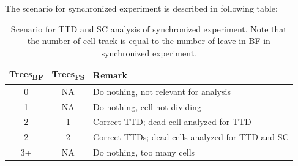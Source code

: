 \documentclass[pdftex,12pt,a4paper]{report}
\begin{document}
The scenario for synchronized experiment is described in following table:

\begin{table}[H]
\centering
\begin{tabular}{ c | c | l  }
Trees\textsubscript{BF} & Trees\textsubscript{FS} & Remark \\
\hline
0 & NA & Do nothing, not relevant for analysis\\
1 & NA & Do nothing, cell not dividing \\
2 & 1 & Correct TTD; dead cell analyzed for TTD \\
2 & 2 & Correct TTDs; dead cells analyzed for TTD and SC \\
3+ & NA & Do nothing, too many cells \\
\end{tabular}
\caption[Scenario for time-to-death (TTD) and sisters death time (SDT) correlation (SC) analysis of synchronized experiment]{Scenario for TTD and SC analysis of synchronized experiment. Note that the number of cell track is equal to the number of leave in BF in synchronized experiment.}
\label{table:scenario_unsynchronized}
\end{table}
\end{document}

